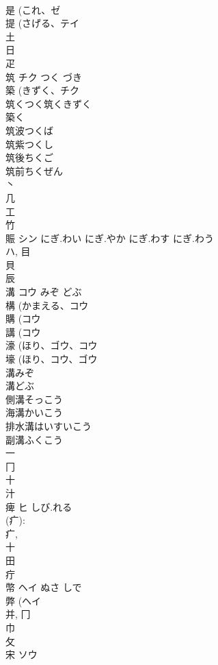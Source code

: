 \documentclass[8pt]{extreport}
\begin{document}
\begin{CJK}{UTF8}{min}
\\	是 (これ、ゼ 
\\	提 (さげる、テイ 
\\	土 
\\	日 
\\	疋 
\\	筑	チク	つく づき	
\\	築 (きずく、チク 
\\	筑くつく筑くきずく
\\	築く
\\	筑波つくば
\\	筑紫つくし
\\	筑後ちくご
\\	筑前ちくぜん
\\	丶 
\\	几 
\\	工 
\\	竹 
\\	賑	シン	にぎ.わい にぎ.やか にぎ.わす にぎ.わう	
\\	ハ, 目 
\\	貝 
\\	辰 
\\	溝	コウ	みぞ どぶ	
\\	構 (かまえる、コウ 
\\	購 (コウ 
\\	講 (コウ 
\\	濠 (ほり、ゴウ、コウ 
\\	壕 (ほり、コウ、ゴウ 
\\	溝みぞ 
\\	溝どぶ 
\\	側溝そっこう 
\\	海溝かいこう 
\\	排水溝はいすいこう 
\\	副溝ふくこう 
\\	一 
\\	冂 
\\	十 
\\	汁 
\\	痺	ヒ	しび.れる	
\\	(疒): 
\\	疒, 
\\	十 
\\	田 
\\	疔 
\\	幣	ヘイ	ぬさ しで	
\\	弊 (ヘイ 
\\	并, 冂 
\\	巾 
\\	攵 
\\	宋	ソウ		

\end{CJK}
\end{document}
